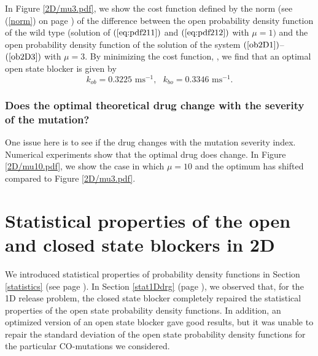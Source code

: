 
In Figure \ref{2D/mu3.pdf}, we show the cost function defined by the norm (see
(\ref{norm}) on page \pageref{norm}) of the difference between the open probability density function of
the wild type (solution of $(\ref{eq:pdf211})$ and $(\ref{eq:pdf212})$ with $\mu=1)$
and the open probability density function of the solution of the system 
$(\ref{ob2D1})$--$(\ref{ob2D3})$ with $\mu=3.$ By minimizing the cost function,
,
we find that an optimal open state blocker is given by
\begin{equation}
k_{ob}=0.3225\text{ ms}^{-1}, \text{  } k_{bo}=0.3346\text{ ms}^{-1}. \label{optob2D}%
\end{equation}

\subsubsection{Does the optimal theoretical drug change with the severity of the mutation?}
One issue here is to see if the drug changes with the mutation severity
index. Numerical experiments show that 
the optimal drug does change. In Figure \ref{2D/mu10.pdf}, we show the case in which $\mu=10$ and the optimum has shifted compared to  Figure \ref{2D/mu3.pdf}.



\section[Statistical properties of blockers in 2D]{Statistical properties of the open and closed state blockers in 2D}

We introduced statistical properties of probability density functions in Section \ref{statistics} (see page \pageref{statistics}). In Section \ref{stat1Ddrg} (page \pageref{stat1Ddrg}), we observed that, for the 1D release problem, the closed state blocker completely repaired the statistical properties of the open state probability density functions. In addition, an optimized version of an open state blocker gave good results, but it was unable to repair the standard deviation of the open state probability density functions
for the particular CO-mutations we considered.


